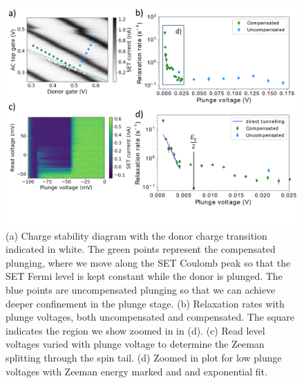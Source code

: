 \documentclass[%
 reprint,
 amsmath,amssymb,
 aps,
]{revtex4-1}
\begin{document}
\begin{figure}
\centering
\includegraphics[width=\columnwidth]{fig5.pdf}
\caption{
(a) Charge stability diagram with the donor charge transition indicated in white. The green points represent the compensated plunging, where we move along the SET Coulomb peak so that the SET Fermi level is kept constant while the donor is plunged. The blue points are uncompensated plunging so that we can achieve deeper confinement in the plunge stage. (b) Relaxation rates with plunge voltages, both uncompensated and compensated. The square indicates the region we show zoomed in in (d). (c) Read level voltages varied with plunge voltage to determine the Zeeman splitting through the spin tail. (d) Zoomed in plot for low plunge voltages with Zeeman energy marked and and exponential fit. 
}
\label{fig:plungedependence}
\end{figure}
\end{document}
